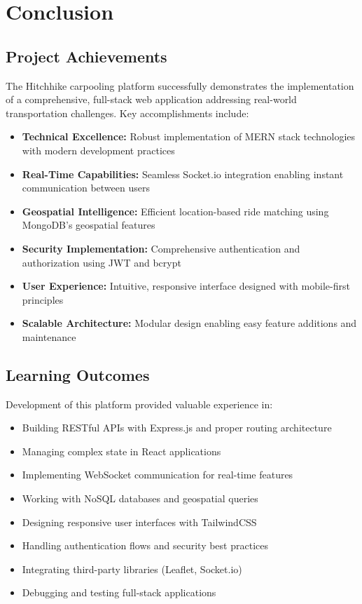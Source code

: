 \documentclass[12pt,a4paper]{article}
\begin{document}
\newpage

\section{Conclusion}

\subsection{Project Achievements}

The Hitchhike carpooling platform successfully demonstrates the implementation of a comprehensive, full-stack web application addressing real-world transportation challenges. Key accomplishments include:

\begin{itemize}
    \item \textbf{Technical Excellence:} Robust implementation of MERN stack technologies with modern development practices
    \item \textbf{Real-Time Capabilities:} Seamless Socket.io integration enabling instant communication between users
    \item \textbf{Geospatial Intelligence:} Efficient location-based ride matching using MongoDB's geospatial features
    \item \textbf{Security Implementation:} Comprehensive authentication and authorization using JWT and bcrypt
    \item \textbf{User Experience:} Intuitive, responsive interface designed with mobile-first principles
    \item \textbf{Scalable Architecture:} Modular design enabling easy feature additions and maintenance
\end{itemize}

\subsection{Learning Outcomes}

Development of this platform provided valuable experience in:

\begin{itemize}
    \item Building RESTful APIs with Express.js and proper routing architecture
    \item Managing complex state in React applications
    \item Implementing WebSocket communication for real-time features
    \item Working with NoSQL databases and geospatial queries
    \item Designing responsive user interfaces with TailwindCSS
    \item Handling authentication flows and security best practices
    \item Integrating third-party libraries (Leaflet, Socket.io)
    \item Debugging and testing full-stack applications
\end{itemize}
\end{document}
